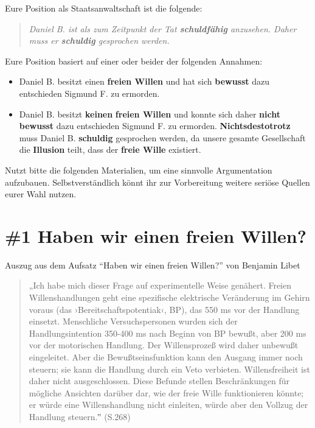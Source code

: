\documentclass[
  a4paper,
]{report}
\begin{document}
Eure Position als Staatsanwaltschaft ist die folgende:

\begin{quote}
\emph{Daniel B. ist als zum Zeitpunkt der Tat \textbf{schuldfähig} anzusehen. Daher muss er \textbf{schuldig} gesprochen werden.}
\end{quote}

Eure Position basiert auf einer oder beider der folgenden Annahmen:

\begin{itemize}
\item
  Daniel B. besitzt einen \textbf{freien Willen} und hat sich \textbf{bewusst} dazu entschieden Sigmund F. zu ermorden.
\item
  Daniel B. besitzt \textbf{keinen} \textbf{freien Willen} und konnte sich daher \textbf{nicht} \textbf{bewusst} dazu entschieden Sigmund F. zu ermorden. \textbf{Nichtsdestotrotz} muss Daniel B. \textbf{schuldig} gesprochen werden, da unsere gesamte Gesellschaft die \textbf{Illusion} teilt, dass der \textbf{freie Wille} existiert.
\end{itemize}

Nutzt bitte die folgenden Materialien, um eine sinnvolle Argumentation aufzubauen. Selbstverständlich könnt ihr zur Vorbereitung weitere seriöse Quellen eurer Wahl nutzen.

\hypertarget{pr-ev1}{%
\section{\#1 Haben wir einen freien Willen?}\label{pr-ev1}}

Auszug aus dem Aufsatz ``Haben wir einen freien Willen?'' von Benjamin Libet \citeyearpar{Libet2004}

\begin{quote}
„Ich habe mich dieser Frage auf experimentelle Weise genähert. Freien Willenshandlungen geht eine spezifische elektrische Veränderung im Gehirn voraus (das ›Bereitschaftspotentiak‹, BP), das 550 ms vor der Handlung einsetzt. Menschliche Versuchspersonen wurden sich der Handlungsintention 350-400 ms nach Beginn von BP bewußt, aber 200 ms vor der motorischen Handlung. Der Willensprozeß wird daher unbewußt eingeleitet. Aber die Bewußtseinsfunktion kann den Ausgang immer noch steuern; sie kann die Handlung durch ein Veto verbieten. Willensfreiheit ist daher nicht ausgeschlossen. Diese Befunde stellen Beschränkungen für mögliche Ansichten darüber dar, wie der freie Wille funktionieren könnte; er würde eine Willenshandlung nicht einleiten, würde aber den Vollzug der Handlung steuern.‟ (S.268)
\end{quote}
\end{document}
